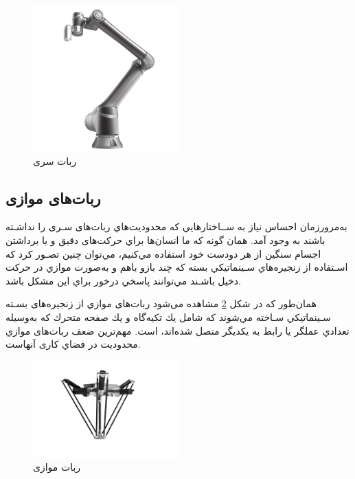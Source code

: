 \begin{figure}[h]
	\centering
	\includegraphics[width=0.5\textwidth]{./images/Chapter1/TechmanTM12}	
	\caption[ربات سری]{ربات سری \cite{SerialRobot}}
	\label{ربات سریال}
\end{figure}
\noindent
\unskip

\subsection{ربات‌های موازی}

به‌مرورزمان احساس نیاز به ســاختارهايي كه محدوديت‌هاي ربات‌های سـری را نداشـته باشند به وجود آمد. همان گونه كه ما انسان‌ها براي حرکت‌های دقيق و يا برداشتن اجسام سنگين از هر دودست خود استفاده مي‌كنيم، مي‌توان چنين تصـور كرد كه اسـتفاده از زنجيره‌هاي سـينماتيكي بسته كه چند بازو باهم و به‌صورت موازي در حركت دخيل باشـند مي‌توانند پاسخي درخور براي اين مشكل باشد. 

همان‌طور که در شکل
\ref{ربات موازی}
مشاهده می‌شود ربات‌های موازي از زنجيره‌های بسـته سـينماتيكي سـاخته مي‌شوند كه شامل يك تكيه‌گاه
\noindent\unskip{}
و يك صفحه متحرك
\noindent\unskip{}
كه به‌وسیله تعدادي عملگر يا رابط به يكديگر متصل شده‌اند، است. مهم‌ترین ضعف ربات‌های موازي محدوديت در فضاي كاری آنهاست. 
\begin{figure}[h]
	\centering
	\includegraphics[width=0.5\textwidth]{./images/Chapter1/Delta2}	
	\caption[ربات موازی]{ربات موازی \cite{ParallelRobot}}
	\label{ربات موازی}
\end{figure}
\noindent
\unskip


